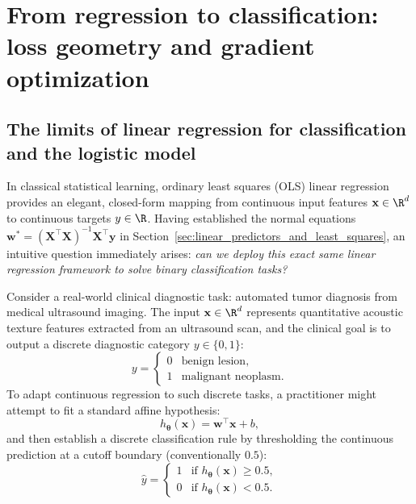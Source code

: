 \chapter{From regression to classification: loss geometry and gradient optimization}
\label{sec:optimization_and_gradient_descent}

\section{The limits of linear regression for classification and the logistic model}
\label{sec:linear_to_logistic}

In classical statistical learning, ordinary least squares (OLS) linear regression provides an elegant, closed-form mapping from continuous input features $\mathbf{x} \in \R^d$ to continuous targets $y \in \R$. Having established the normal equations $\mathbf{w}^* = (\mathbf{X}^\top \mathbf{X})^{-1}\mathbf{X}^\top \mathbf{y}$ in Section~\ref{sec:linear_predictors_and_least_squares}, an intuitive question immediately arises: \textit{can we deploy this exact same linear regression framework to solve binary classification tasks?}

Consider a real-world clinical diagnostic task: automated tumor diagnosis from medical ultrasound imaging. The input $\mathbf{x} \in \R^d$ represents quantitative acoustic texture features extracted from an ultrasound scan, and the clinical goal is to output a discrete diagnostic category $y \in \{0, 1\}$:
\begin{equation}
y = \begin{cases} 0 & \text{benign lesion}, \\ 1 & \text{malignant neoplasm}. \end{cases}
\label{eq:clinical_tumor_categories}
\end{equation}
To adapt continuous regression to such discrete tasks, a practitioner might attempt to fit a standard affine hypothesis:
\begin{equation}
h_{\boldsymbol{\theta}}(\mathbf{x}) = \mathbf{w}^\top \mathbf{x} + b,
\label{eq:linear_hypothesis_classification}
\end{equation}
and then establish a discrete classification rule by thresholding the continuous prediction at a cutoff boundary (conventionally $0.5$):
\begin{equation}
\hat{y} = \begin{cases} 1 & \text{if } h_{\boldsymbol{\theta}}(\mathbf{x}) \ge 0.5, \\ 0 & \text{if } h_{\boldsymbol{\theta}}(\mathbf{x}) < 0.5. \end{cases}
\label{eq:naive_thresholding}
\end{equation}

